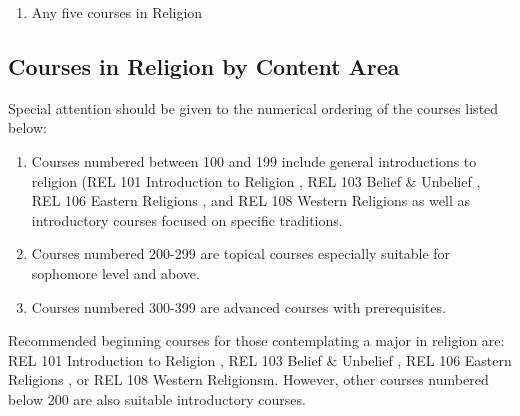 \documentclass[
  letterpaper,
]{scrbook}
\providecommand{\tightlist}{%
  \setlength{\itemsep}{0pt}\setlength{\parskip}{0pt}}
\begin{document}
\begin{enumerate}
\def\labelenumi{\arabic{enumi}.}
\tightlist
\item
  Any five courses in Religion
\end{enumerate}

\subsection{Courses in Religion by Content
Area}\label{courses-in-religion-by-content-area}

Special attention should be given to the numerical ordering of the
courses listed below:

\begin{enumerate}
\def\labelenumi{\arabic{enumi}.}
\item
  Courses numbered between 100 and 199 include general introductions to
  religion (REL 101 Introduction to Religion , REL 103 Belief \&
  Unbelief , REL 106 Eastern Religions , and REL 108 Western Religions
  as well as introductory courses focused on specific traditions.
\item
  Courses numbered 200-299 are topical courses especially suitable for
  sophomore level and above.
\item
  Courses numbered 300-399 are advanced courses with prerequisites.
\end{enumerate}

Recommended beginning courses for those contemplating a major in
religion are: REL 101 Introduction to Religion , REL 103 Belief \&
Unbelief , REL 106 Eastern Religions , or REL 108 Western Religionsm.
However, other courses numbered below 200 are also suitable introductory
courses.
\end{document}
